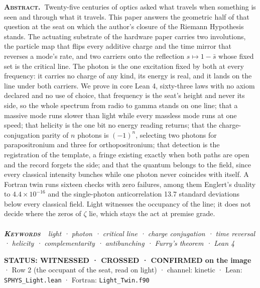 \documentclass[10pt]{article}
\renewenvironment{quote}{\par\smallskip\noindent\small\color{deep}}{\par\smallskip}
\begin{document}
{\small\noindent\textbf{\scshape\color{deep}Abstract.\ }Twenty-five
centuries of optics asked what travels when something is seen and
through what it travels. This paper answers the geometric half of that
question at the seat on which the author's closure of the Riemann
Hypothesis stands. The actuating substrate of the hardware paper carries
two involutions, the particle map that flips every additive charge and
the time mirror that reverses a mode's rate, and two carriers onto the
reflection \(s\mapsto1-\bar s\) whose fixed set is the critical line.
The photon is the one excitation fixed by both at every frequency: it
carries no charge of any kind, its energy is real, and it lands on the
line under both carriers. We prove in core Lean 4, sixty-three laws with
no axiom declared and no use of choice, that frequency is the seat's
height and never its side, so the whole spectrum from radio to gamma
stands on one line; that a massive mode runs slower than light while
every massless mode runs at one speed; that helicity is the one bit no
energy reading returns; that the charge-conjugation parity of \(n\)
photons is \((-1)^n\), selecting two photons for parapositronium and
three for orthopositronium; that detection is the registration of the
template, a fringe existing exactly when both paths are open and the
record forgets the side; and that the quantum belongs to the field,
since every classical intensity bunches while one photon never coincides
with itself. A Fortran twin runs sixteen checks with zero failures,
among them Englert's duality to \(4.4\times10^{-16}\) and the
single-photon anticorrelation 13.7 standard deviations below every
classical field. Light witnesses the occupancy of the line; it does not
decide where the zeros of \(\zeta\) lie, which stays the act at premise
grade.}\\[-2pt]
\noindent{\color{accent}\rule{\textwidth}{0.6pt}}\\[1pt]
{\itshape\footnotesize\color{faint}\noindent\textbf{\upshape\scshape\color{deep}Keywords\ }\ light
· photon · critical line · charge conjugation · time reversal · helicity
· complementarity · antibunching · Furry's theorem · Lean
4}\par\vspace{8pt}
\thispagestyle{fancy}
\begin{quote}
\textbf{STATUS: WITNESSED · CROSSED · CONFIRMED on the image} · Row 2
(the occupant of the seat, read on light) · channel: kinetic · Lean:
\texttt{SPHYS\_Light.lean} · Fortran: \texttt{Light\_Twin.f90}
\end{quote}
\end{document}
